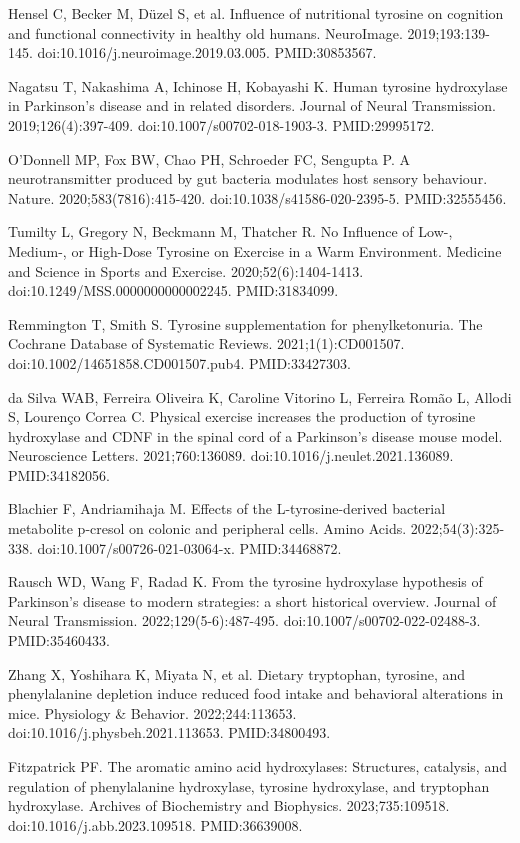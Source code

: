 \documentclass[12pt,oneside]{book}
\newcommand{\reff}[2]{\par\hangindent=7mm\hangafter=1\noindent[#1]\hspace{2mm}#2\par}
\begin{document}
\reff{9}{Hensel C, Becker M, Düzel S, et al. Influence of nutritional tyrosine on cognition and functional connectivity in healthy old humans. NeuroImage. 2019;193:139-145. doi:10.1016/j.neuroimage.2019.03.005. PMID:30853567.}

\reff{10}{Nagatsu T, Nakashima A, Ichinose H, Kobayashi K. Human tyrosine hydroxylase in Parkinson's disease and in related disorders. Journal of Neural Transmission. 2019;126(4):397-409. doi:10.1007/s00702-018-1903-3. PMID:29995172.}

\reff{11}{O'Donnell MP, Fox BW, Chao PH, Schroeder FC, Sengupta P. A neurotransmitter produced by gut bacteria modulates host sensory behaviour. Nature. 2020;583(7816):415-420. doi:10.1038/s41586-020-2395-5. PMID:32555456.}

\reff{12}{Tumilty L, Gregory N, Beckmann M, Thatcher R. No Influence of Low-, Medium-, or High-Dose Tyrosine on Exercise in a Warm Environment. Medicine and Science in Sports and Exercise. 2020;52(6):1404-1413. doi:10.1249/MSS.0000000000002245. PMID:31834099.}

\reff{13}{Remmington T, Smith S. Tyrosine supplementation for phenylketonuria. The Cochrane Database of Systematic Reviews. 2021;1(1):CD001507. doi:10.1002/14651858.CD001507.pub4. PMID:33427303.}

\reff{14}{da Silva WAB, Ferreira Oliveira K, Caroline Vitorino L, Ferreira Romão L, Allodi S, Lourenço Correa C. Physical exercise increases the production of tyrosine hydroxylase and CDNF in the spinal cord of a Parkinson's disease mouse model. Neuroscience Letters. 2021;760:136089. doi:10.1016/j.neulet.2021.136089. PMID:34182056.}

\reff{15}{Blachier F, Andriamihaja M. Effects of the L-tyrosine-derived bacterial metabolite p-cresol on colonic and peripheral cells. Amino Acids. 2022;54(3):325-338. doi:10.1007/s00726-021-03064-x. PMID:34468872.}

\reff{16}{Rausch WD, Wang F, Radad K. From the tyrosine hydroxylase hypothesis of Parkinson's disease to modern strategies: a short historical overview. Journal of Neural Transmission. 2022;129(5-6):487-495. doi:10.1007/s00702-022-02488-3. PMID:35460433.}

\reff{17}{Zhang X, Yoshihara K, Miyata N, et al. Dietary tryptophan, tyrosine, and phenylalanine depletion induce reduced food intake and behavioral alterations in mice. Physiology \& Behavior. 2022;244:113653. doi:10.1016/j.physbeh.2021.113653. PMID:34800493.}

\reff{18}{Fitzpatrick PF. The aromatic amino acid hydroxylases: Structures, catalysis, and regulation of phenylalanine hydroxylase, tyrosine hydroxylase, and tryptophan hydroxylase. Archives of Biochemistry and Biophysics. 2023;735:109518. doi:10.1016/j.abb.2023.109518. PMID:36639008.}
\end{document}
